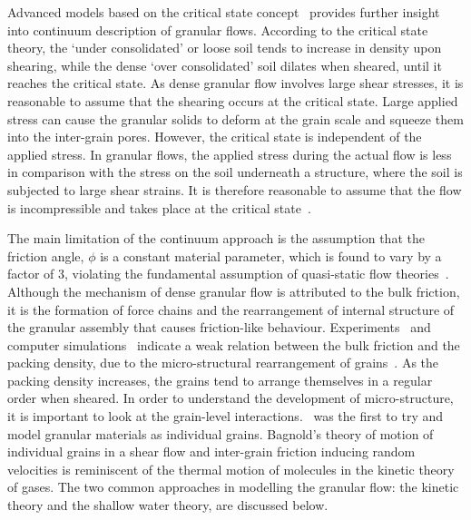 Advanced models based on the critical state concept~\citep{Schofield1968} 
provides further insight into 
continuum description of granular flows. According to the critical state 
theory, the `under consolidated' or loose soil tends to increase in density 
upon shearing, while the dense `over consolidated' soil dilates when sheared, 
until it reaches the critical state. As dense granular flow involves large 
shear stresses, it is reasonable to assume that the shearing occurs at the 
critical state. Large applied stress can cause the granular solids to deform 
at the grain scale and squeeze them into the inter-grain pores. However, the 
critical state is independent of the applied stress. In granular flows, the 
applied stress during the actual flow is less in comparison with the stress on 
the soil underneath a structure, where the soil is subjected to large shear 
strains. It is therefore reasonable to assume that the flow is incompressible 
and takes place at the critical state~\citep{Campbell2006}. 

The main limitation 
of the continuum approach is the assumption that the friction angle, $\phi$ is 
a constant material parameter, which is found to vary by a factor of 3, 
violating the fundamental assumption of quasi-static flow 
theories~\citep{Potapov1996}. Although the mechanism of dense granular flow is 
attributed to the bulk friction, it is the formation of force chains and the 
rearrangement of internal structure of the granular assembly that causes 
friction-like behaviour. Experiments~\citep{Savage1984,Savage1984a} and 
computer simulations~\citep{Campbell1985} indicate a weak relation between the 
bulk friction and the packing density, due to the micro-structural 
rearrangement of grains~\citep{Campbell1986}. As the packing density 
increases, the grains tend to arrange themselves in a regular order when 
sheared. In order to understand the development of micro-structure, it is 
important to look at the grain-level interactions.~\citet{Bagnold1954} was 
the first to try and model granular materials as individual grains. 
Bagnold's theory of motion of individual grains in a shear flow and 
inter-grain friction inducing random velocities is reminiscent of the 
thermal motion of molecules in the kinetic theory of gases. The two common 
approaches in modelling the granular flow: the kinetic theory and the shallow 
water theory, are discussed below.

